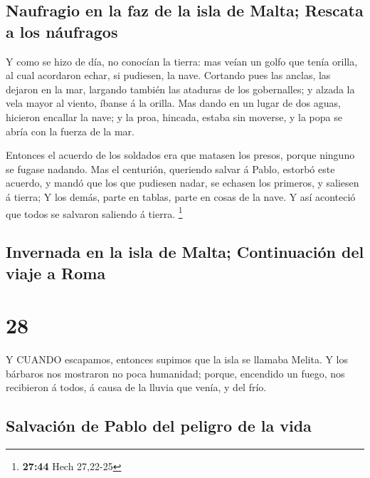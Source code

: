 \hypertarget{naufragio-en-la-faz-de-la-isla-de-malta-rescata-a-los-nuxe1ufragos}{%
\subsection{Naufragio en la faz de la isla de Malta; Rescata a los
náufragos}\label{naufragio-en-la-faz-de-la-isla-de-malta-rescata-a-los-nuxe1ufragos}}

 Y como se hizo de día, no conocían la tierra: mas veían un
golfo que tenía orilla, al cual acordaron echar, si pudiesen, la nave.
 Cortando pues las anclas, las dejaron en la mar, largando
también las ataduras de los gobernalles; y alzada la vela mayor al
viento, íbanse á la orilla.  Mas dando en un lugar de dos
aguas, hicieron encallar la nave; y la proa, hincada, estaba sin
moverse, y la popa se abría con la fuerza de la mar.

 Entonces el acuerdo de los soldados era que matasen los
presos, porque ninguno se fugase nadando.  Mas el
centurión, queriendo salvar á Pablo, estorbó este acuerdo, y mandó que
los que pudiesen nadar, se echasen los primeros, y saliesen á tierra;
 Y los demás, parte en tablas, parte en cosas de la nave. Y
así aconteció que todos se salvaron saliendo á tierra. \footnote{\textbf{27:44}
  Hech 27,22-25}

\hypertarget{invernada-en-la-isla-de-malta-continuaciuxf3n-del-viaje-a-roma}{%
\subsection{Invernada en la isla de Malta; Continuación del viaje a
Roma}\label{invernada-en-la-isla-de-malta-continuaciuxf3n-del-viaje-a-roma}}

\hypertarget{section-27}{%
\section{28}\label{section-27}}

 Y CUANDO escapamos, entonces supimos que la isla se llamaba
Melita.  Y los bárbaros nos mostraron no poca humanidad;
porque, encendido un fuego, nos recibieron á todos, á causa de la lluvia
que venía, y del frío.

\hypertarget{salvaciuxf3n-de-pablo-del-peligro-de-la-vida}{%
\subsection{Salvación de Pablo del peligro de la
vida}\label{salvaciuxf3n-de-pablo-del-peligro-de-la-vida}}

